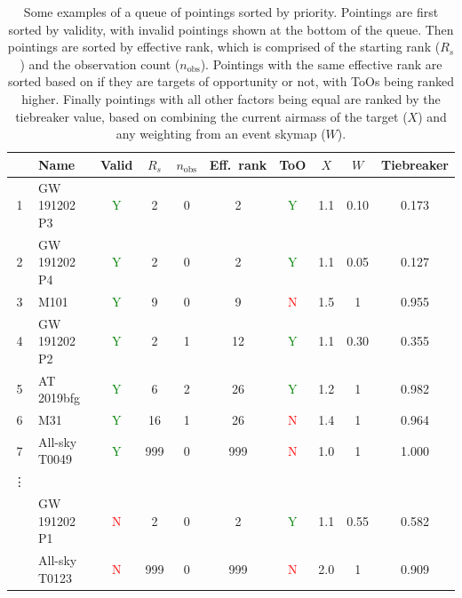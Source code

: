 \begin{colsection}
\begin{colsection}
\begin{table}[t]
    \begin{center}
        \begin{tabular}{c|l|c|ccc|c|ccc} %
            & Name & Valid & $R_s$ & $n_\text{obs}$ & Eff.\ rank & ToO & $X$ & $W$ & Tiebreaker \\
            \midrule
            1 & GW 191202 P3  & \textcolor{Green}{Y} &  2  & 0 &   2 & \textcolor{Green}{Y} & 1.1 & 0.10 & 0.173 \\
            2 & GW 191202 P4  & \textcolor{Green}{Y} &  2  & 0 &   2 & \textcolor{Green}{Y} & 1.1 & 0.05 & 0.127 \\
            3 &         M101  & \textcolor{Green}{Y} &  9  & 0 &   9 &   \textcolor{Red}{N} & 1.5 &    1 & 0.955 \\
            4 & GW 191202 P2  & \textcolor{Green}{Y} &  2  & 1 &  12 & \textcolor{Green}{Y} & 1.1 & 0.30 & 0.355 \\
            5 &   AT 2019bfg  & \textcolor{Green}{Y} &  6  & 2 &  26 & \textcolor{Green}{Y} & 1.2 &    1 & 0.982 \\
            6 &          M31  & \textcolor{Green}{Y} &  16 & 1 &  26 &   \textcolor{Red}{N} & 1.4 &    1 & 0.964 \\
            7 & All-sky T0049 & \textcolor{Green}{Y} & 999 & 0 & 999 &   \textcolor{Red}{N} & 1.0 &    1 & 1.000 \\
            \vdots & & & & & & \\
              &  GW 191202 P1 &   \textcolor{Red}{N} &   2 & 0 &   2 & \textcolor{Green}{Y} & 1.1 & 0.55 & 0.582 \\
              & All-sky T0123 &   \textcolor{Red}{N} & 999 & 0 & 999 &   \textcolor{Red}{N} & 2.0 &    1 & 0.909 \\
        \end{tabular}
    \end{center}
    \caption[Examples of sorting pointings by priority]{
        Some examples of a queue of pointings sorted by priority. Pointings are first sorted by validity, with invalid pointings shown at the bottom of the queue. Then pointings are sorted by effective rank, which is comprised of the starting rank ($R_s$) and the observation count ($n_\text{obs}$). Pointings with the same effective rank are sorted based on if they are targets of opportunity or not, with ToOs being ranked higher. Finally pointings with all other factors being equal are ranked by the tiebreaker value, based on combining the current airmass of the target ($X$) and any weighting from an event skymap ($W$).
    }\label{tab:priority}
\end{table}


\end{colsection}
\end{colsection}

